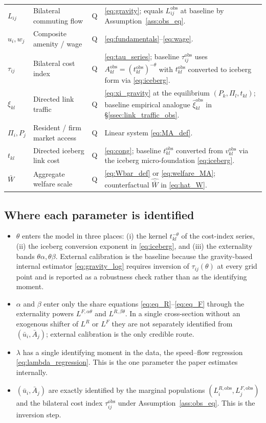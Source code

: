 \documentclass[12pt]{article}
\newcommand{\Wbar}{\bar W}
\newcommand{\ubar}{\bar u}
\newcommand{\Abar}{\bar A}
\newcommand{\tkl}{t_{kl}}
\newcommand{\tijk}{\tau_{ij}}
\newcommand{\obs}{\mathrm{obs}}
\begin{document}
\begin{small}
\begin{longtable}{p{2.0cm}p{4.4cm}cp{6.3cm}}
$L_{ij}$ & Bilateral commuting flow & Q & \eqref{eq:gravity}; equals $L_{ij}^{\obs}$ at baseline by Assumption~\ref{ass:obs_eq}.\\
$u_i,w_j$ & Composite amenity / wage & Q & \eqref{eq:fundamentals}--\eqref{eq:wage}.\\
$\tijk$ & Bilateral cost index & Q & \eqref{eq:tau_series}; baseline $\tijk^{\obs}$ uses $A^{\obs}_{kl}=(\tkl^{\obs})^{-\theta}$ with $\tkl^{\obs}$ converted to iceberg form via \eqref{eq:iceberg}.\\
$\xi_{kl}$ & Directed link traffic & Q & \eqref{eq:xi_gravity} at the equilibrium $(P_k,\Pi_l,\tkl)$; baseline empirical analogue $\hat\xi_{kl}^{\obs}$ in \S\ref{ssec:link_traffic_obs}.\\
$\Pi_i, P_j$ & Resident / firm market access & Q & Linear system \eqref{eq:MA_def}.\\
$\tkl$ & Directed iceberg link cost & Q & \eqref{eq:cong}; baseline $\tkl^{\obs}$ converted from $v_{kl}^{\obs}$ via the iceberg micro-foundation \eqref{eq:iceberg}.\\
$\Wbar$ & Aggregate welfare scale & Q & \eqref{eq:Wbar_def} or \eqref{eq:welfare_MA}; counterfactual $\hat{\Wbar}$ in \eqref{eq:hat_W}.\\
\end{longtable}
\end{small}

\subsection{Where each parameter is identified}\label{ssec:identification_map}

\begin{itemize}[leftmargin=2em,itemsep=0.2em]
\item $\theta$ enters the model in three places: (i) the kernel
  $\tkl^{-\theta}$ of the cost-index series, (ii) the iceberg
  conversion exponent in \eqref{eq:iceberg}, and (iii) the
  externality bands $\theta\alpha,\theta\beta$.  External calibration
  is the baseline because the gravity-based internal estimator
  \eqref{eq:gravity_log} requires inversion of $\tijk(\theta)$ at
  every grid point and is reported as a robustness check rather than
  as the identifying moment.
\item $\alpha$ and $\beta$ enter only the share equations
  \eqref{eq:eq_R}--\eqref{eq:eq_F} through the externality powers
  $L^{F,\alpha\theta}$ and $L^{R,\beta\theta}$.  In a single
  cross-section without an exogenous shifter of $L^R$ or $L^F$ they
  are not separately identified from $(\ubar_i,\Abar_j)$; external
  calibration is the only credible route.
\item $\lambda$ has a single identifying moment in the data, the
  speed--flow regression \eqref{eq:lambda_regression}.  This is the
  one parameter the paper estimates internally.
\item $(\ubar_i,\Abar_j)$ are exactly identified by the marginal
  populations $(L_i^{R,\obs},L_j^{F,\obs})$ and the bilateral cost
  index $\tijk^{\obs}$ under Assumption~\ref{ass:obs_eq}.  This is
  the inversion step.
\end{itemize}
\end{document}
